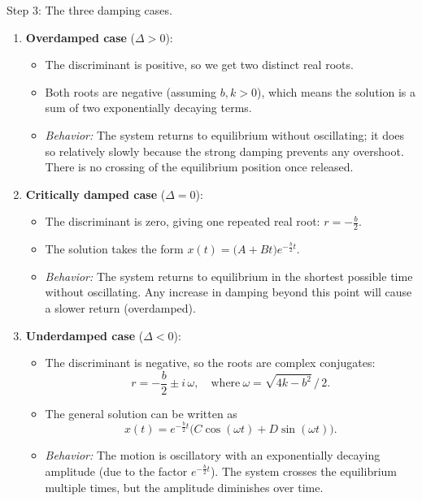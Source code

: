 \documentclass{article}
\begin{document}
{Step 3: The three damping cases.}
\begin{enumerate}
    \item \textbf{Overdamped case} (\(\Delta > 0\)): 
    \begin{itemize}
        \item The discriminant is positive, so we get two distinct real roots.
        \item Both roots are negative (assuming \(b, k > 0\)), which means the solution is a sum of two exponentially decaying terms.
        \item \textit{Behavior:} The system returns to equilibrium without oscillating; it does so relatively slowly because the strong damping prevents any overshoot. There is no crossing of the equilibrium position once released.
    \end{itemize}
    
    \item \textbf{Critically damped case} (\(\Delta = 0\)):
    \begin{itemize}
        \item The discriminant is zero, giving one repeated real root: \(r = -\tfrac{b}{2}\).
        \item The solution takes the form \(x(t) = \big(A + Bt\big)e^{-\frac{b}{2}t}\).
        \item \textit{Behavior:} The system returns to equilibrium in the shortest possible time without oscillating. Any increase in damping beyond this point will cause a slower return (overdamped).
    \end{itemize}
    
    \item \textbf{Underdamped case} (\(\Delta < 0\)):
    \begin{itemize}
        \item The discriminant is negative, so the roots are complex conjugates: 
        \[
        r = -\frac{b}{2} \pm i\,\omega, \quad \text{where}\ \omega = \sqrt{4k - b^2}\,/\,2.
        \]
        \item The general solution can be written as
        \[
        x(t) = e^{-\frac{b}{2}t}\Big(C \cos(\omega t) + D \sin(\omega t)\Big).
        \]
        \item \textit{Behavior:} The motion is oscillatory with an exponentially decaying amplitude (due to the factor \(e^{-\frac{b}{2}t}\)). The system crosses the equilibrium multiple times, but the amplitude diminishes over time.
    \end{itemize}
\end{enumerate}
\end{document}
